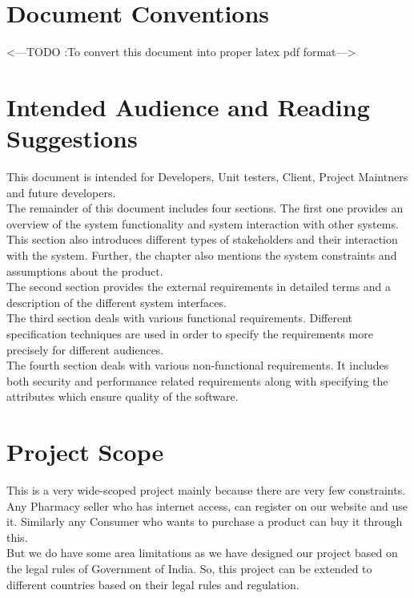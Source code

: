 \documentclass{scrreprt}
\begin{document}
\section{Document Conventions}
<---TODO :To convert this document into proper latex pdf format--->

\section{Intended Audience and Reading Suggestions}
This document is intended for Developers, Unit testers, Client, Project Maintners and future developers. \\

The remainder of this document includes four sections.
The first one provides an overview of the system functionality and system interaction with other systems. This section also introduces different types of stakeholders and their interaction with the system. Further, the chapter also mentions the system constraints and assumptions about the product.  \\

The second section provides the external requirements in detailed terms and a description of the different system interfaces.  \\

The third section deals with various functional requirements. Different specification techniques are used in order to specify the requirements more precisely for different audiences.    \\

The fourth section deals with various non-functional requirements. It includes both security and performance related requirements along with specifying the attributes which ensure quality of the software.   \\


\section{Project Scope}
This is a very wide-scoped project mainly because there are very few constraints. Any Pharmacy seller who has internet access, can register on our website and use it. Similarly any Consumer who wants to purchase a product can buy it through this.   \\

But we do have some area limitations as we have designed our project based on the legal rules of Government of India. So, this project can be extended to different countries based on their legal rules and regulation.
\end{document}
